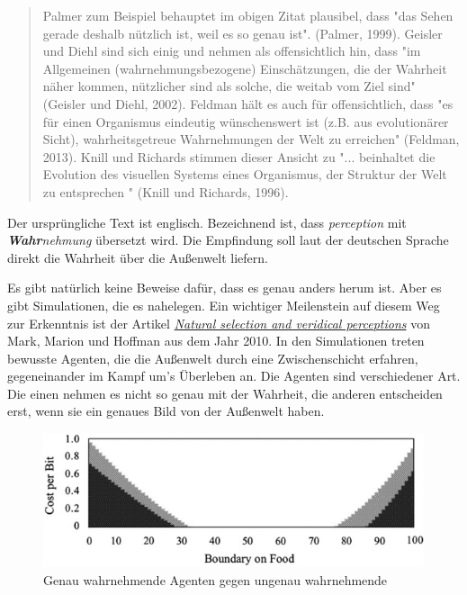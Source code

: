 \documentclass[12pt]{book}
\begin{document}

\begin{quote}\begin{tcolorbox}
Palmer zum Beispiel behauptet im obigen Zitat plausibel, dass "das Sehen gerade deshalb nützlich ist, weil es so genau ist". (Palmer, 1999). Geisler und Diehl sind sich einig und nehmen als offensichtlich hin, dass "im Allgemeinen (wahrnehmungsbezogene) Einschätzungen, die der Wahrheit näher kommen, nützlicher sind als solche, die weitab vom Ziel sind" (Geisler und Diehl, 2002). Feldman hält es auch für offensichtlich, dass "es für einen Organismus eindeutig wünschenswert ist (z.B. aus evolutionärer Sicht), wahrheitsgetreue Wahrnehmungen der Welt zu erreichen" (Feldman, 2013). Knill und Richards stimmen dieser Ansicht zu "... beinhaltet die Evolution des visuellen Systems eines Organismus, der Struktur der Welt zu entsprechen " (Knill und Richards, 1996).
\end{tcolorbox}\end{quote}

Der ursprüngliche Text ist englisch. Bezeichnend ist, dass \textit{perception} mit \textit{\textbf{Wahr}nehmung} übersetzt wird. Die Empfindung soll laut der deutschen Sprache direkt die Wahrheit über die Außenwelt liefern.

Es gibt natürlich keine Beweise dafür, dass es genau anders herum ist. Aber es gibt Simulationen, die es nahelegen. Ein wichtiger Meilenstein auf diesem Weg zur Erkenntnis ist der Artikel \href{http://cogsci.uci.edu/~ddhoff/PerceptualEvolution.pdf}{\textit{Natural selection and veridical perceptions}} von Mark, Marion und Hoffman aus dem Jahr 2010. In den Simulationen treten bewusste Agenten, die die Außenwelt durch eine Zwischenschicht erfahren, gegeneinander im Kampf um's Überleben an. Die Agenten sind verschiedener Art. Die einen nehmen es nicht so genau mit der Wahrheit, die anderen entscheiden erst, wenn sie ein genaues Bild von der Außenwelt haben.

\begin{figure}[!h]\begin{center}
  \includegraphics[width=13cm]{Bilder/Single_Resource_Game.png}
  \caption{Genau wahrnehmende Agenten gegen ungenau wahrnehmende}
  \label{fig:srgame}
\end{center}\end{figure}
\end{document}

